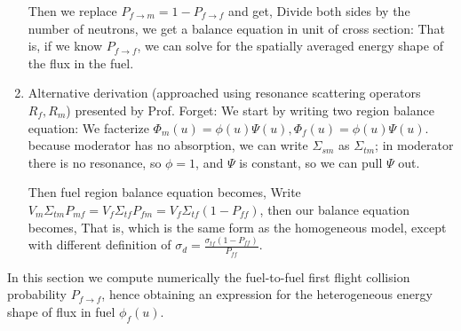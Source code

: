 \documentclass{school-22.211-notes}
\begin{document}
\begin{enumerate}
Then we replace $P_{f\to m} = 1 - P_{f\to f}$ and get, 
Divide both sides by the number of neutrons, we get a balance equation in unit of cross section:
That is, if we know $P_{f\to f}$, we can solve for the spatially averaged energy shape of the flux in the fuel. 


\item Alternative derivation (approached using resonance scattering operators $R_f, R_m$) presented by Prof. Forget: We start by writing two region balance equation: 
We facterize $\Phi_m(u) = \phi(u) \Psi(u), \Phi_f (u) = \phi(u) \Psi(u)$. 
because moderator has no absorption, we can write $\Sigma_{sm}$ as $\Sigma_{tm}$; in moderator there is no resonance, so $\phi = 1$, and $\Psi$ is constant, so we can pull $\Psi$ out. 

Then fuel region balance equation becomes,
Write $V_m \Sigma_{tm} P_{mf} = V_f \Sigma_{tf} P_{fm} = V_f \Sigma_{tf} (1- P_{ff})$, then our balance equation becomes, 
That is, 
which is the same form as the homogeneous model, except with  different definition of $\sigma_d = \frac{\sigma_{tf} (1 - P_{ff})}{P_{ff}}$. 
\end{enumerate}





\clearpage
{}
In this section we compute numerically the fuel-to-fuel first flight collision probability $P_{f\to f}$, hence obtaining an expression for the heterogeneous energy shape of flux in fuel $\phi_f(u)$. 
\end{document}
